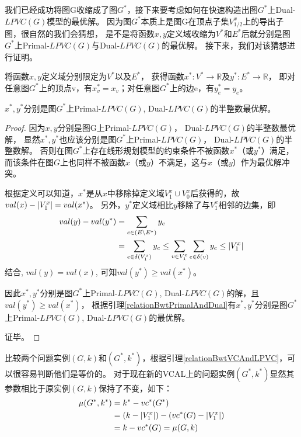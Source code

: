 我们已经成功将图G收缩成了图$G^*$，接下来要考虑如何在快速构造出图$G^*$上Dual-$LPVC(G)$模型的最优解。
因为图$G^*$本质上是图G在顶点子集$V^x_{1/2}$上的导出子图，很自然的我们会猜想，
是不是将函数$x,y$定义域收缩为$V^*$和$E^*$后就分别是图$G^*$上Primal-$LPVC(G)$与Dual-$LPVC(G)$的最优解。
接下来，我们对该猜想进行证明。

将函数$x,y$定义域分别限定为$V^*$以及$E^*$，
获得函数$x^*:V^* \rightarrow \mathbb{R}$及$y^*:E^* \rightarrow \mathbb{R}$，
即对任意图$G^*$上的顶点v，有$x^*_v=x_v$；对任意图$G^*$上的边e，有$y^*_e=y_e$。
\begin{claim}
$x^*, y^*$分别是图$G^*$上Primal-$LPVC(G)$, Dual-$LPVC(G)$的半整数最优解。
\end{claim}
\begin{proof}
因为$x, y$分别是图G上Primal-$LPVC(G)$， Dual-$LPVC(G)$的半整数最优解，
显然$x^*, y^*$也应该分别是图$G^*$上Primal-$LPVC(G)$， Dual-$LPVC(G)$的半整数解。
否则在图$G^*$上存在线形规划模型的约束条件不被函数$x^*$（或$y^*$）满足，而该条件在图$G$上也同样不被函数$x$（或$y$）不满足，这与$x$（或$y$）作为最优解冲突。

根据定义可以知道，$x^*$是从$x$中移除掉定义域$V^x_1 \cup V^x_0$后获得的，故$val(x) - \left\vert V^x_1 \right\vert = val(x^*)$。
另外，$y^*$定义域相比$y$移除了与$V^x_1$相邻的边集，即
\begin{equation*} \begin{aligned}
val(y) - val(y^*) & = \sum_{e \in (E \setminus E^*)}{y_e} 
\\ & = \sum_{e \in \delta(V^x_1)}{y_e}  \le \sum_{v \in V^x_1}{\sum_{e \in \delta(v)}{y_e}}\le\left\vert V^x_1 \right\vert
\end{aligned}\end{equation*}
结合, $val(y) = val(x)$, 可知$val(y^*) \ge val(x^*)$。

因此$x^*, y^*$分别是图$G^*$上Primal-$LPVC(G)$, Dual-$LPVC(G)$的解，且$val(y^*) \ge val(x^*)$，
根据引理\ref{relationBwtPrimalAndDual}有$x^*, y^*$分别是图$G^*$上Primal-$LPVC(G)$, Dual-$LPVC(G)$的最优解。

证毕。
\end{proof}

比较两个问题实例$(G, k)$和$(G^*, k^*)$，根据引理\ref{relationBwtVCAndLPVC}，可以很容易判断他们是等价的。
对于现在新的VCAL上的问题实例$(G^*, k^*)$显然其参数相比于原实例$(G, k)$保持了不变，如下：
\begin{equation*} \begin{aligned}
  \mu(G^*, k^*) &= k^* - vc^*(G^*) \\
                &= (k - \left\vert V^x_1 \right\vert) - (vc^*(G) - \left\vert V^x_1 \right\vert) \\
                &= k - vc^*(G) = \mu(G, k)
\end{aligned} \end{equation*}

